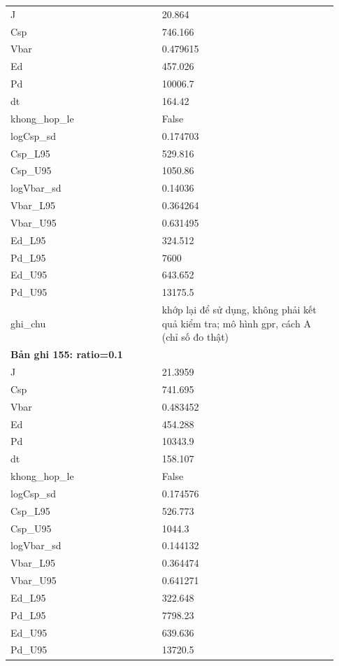 \begin{longtable}{p{0.43\linewidth}p{0.50\linewidth}}
J & 20.864 \\
Csp & 746.166 \\
Vbar & 0.479615 \\
Ed & 457.026 \\
Pd & 10006.7 \\
dt & 164.42 \\
khong\_\allowbreak hop\_\allowbreak le & False \\
logCsp\_\allowbreak sd & 0.174703 \\
Csp\_\allowbreak L95 & 529.816 \\
Csp\_\allowbreak U95 & 1050.86 \\
logVbar\_\allowbreak sd & 0.14036 \\
Vbar\_\allowbreak L95 & 0.364264 \\
Vbar\_\allowbreak U95 & 0.631495 \\
Ed\_\allowbreak L95 & 324.512 \\
Pd\_\allowbreak L95 & 7600 \\
Ed\_\allowbreak U95 & 643.652 \\
Pd\_\allowbreak U95 & 13175.5 \\
ghi\_\allowbreak chu & khớp lại để sử dụng, không phải kết quả kiểm tra; mô hình gpr, cách A (chỉ số đo thật) \\
\midrule
\multicolumn{2}{p{0.95\linewidth}}{\textbf{Bản ghi 155: ratio=0.1}} \\
J & 21.3959 \\
Csp & 741.695 \\
Vbar & 0.483452 \\
Ed & 454.288 \\
Pd & 10343.9 \\
dt & 158.107 \\
khong\_\allowbreak hop\_\allowbreak le & False \\
logCsp\_\allowbreak sd & 0.174576 \\
Csp\_\allowbreak L95 & 526.773 \\
Csp\_\allowbreak U95 & 1044.3 \\
logVbar\_\allowbreak sd & 0.144132 \\
Vbar\_\allowbreak L95 & 0.364474 \\
Vbar\_\allowbreak U95 & 0.641271 \\
Ed\_\allowbreak L95 & 322.648 \\
Pd\_\allowbreak L95 & 7798.23 \\
Ed\_\allowbreak U95 & 639.636 \\
Pd\_\allowbreak U95 & 13720.5 \\

\end{longtable}

